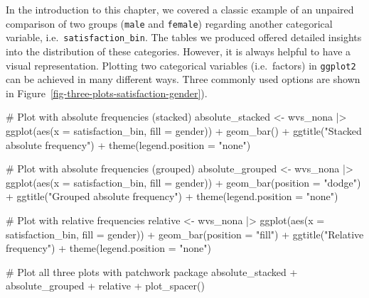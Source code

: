 \documentclass[
  letterpaper,
  DIV=11,
  numbers=noendperiod]{scrreprt}
\newenvironment{Shaded}{\begin{snugshade}}{\end{snugshade}}
\newcommand{\AttributeTok}[1]{\textcolor[rgb]{0.40,0.45,0.13}{#1}}
\newcommand{\CommentTok}[1]{\textcolor[rgb]{0.37,0.37,0.37}{#1}}
\newcommand{\FunctionTok}[1]{\textcolor[rgb]{0.28,0.35,0.67}{#1}}
\newcommand{\NormalTok}[1]{\textcolor[rgb]{0.00,0.23,0.31}{#1}}
\newcommand{\OtherTok}[1]{\textcolor[rgb]{0.00,0.23,0.31}{#1}}
\newcommand{\SpecialCharTok}[1]{\textcolor[rgb]{0.37,0.37,0.37}{#1}}
\newcommand{\StringTok}[1]{\textcolor[rgb]{0.13,0.47,0.30}{#1}}
\begin{document}
In the introduction to this chapter, we covered a classic example of an
unpaired comparison of two groups (\texttt{male} and \texttt{female})
regarding another categorical variable, i.e.~\texttt{satisfaction\_bin}.
The tables we produced offered detailed insights into the distribution
of these categories. However, it is always helpful to have a visual
representation. Plotting two categorical variables (i.e.~factors) in
\texttt{ggplot2} can be achieved in many different ways. Three commonly
used options are shown in
Figure~\ref{fig-three-plots-satisfaction-gender}).

\begin{Shaded}
\begin{Highlighting}[]
\CommentTok{\# Plot with absolute frequencies (stacked)}
\NormalTok{absolute\_stacked }\OtherTok{\textless{}{-}}
\NormalTok{  wvs\_nona }\SpecialCharTok{|\textgreater{}}
  \FunctionTok{ggplot}\NormalTok{(}\FunctionTok{aes}\NormalTok{(}\AttributeTok{x =}\NormalTok{ satisfaction\_bin,}
             \AttributeTok{fill =}\NormalTok{ gender)) }\SpecialCharTok{+}
  \FunctionTok{geom\_bar}\NormalTok{() }\SpecialCharTok{+}
  \FunctionTok{ggtitle}\NormalTok{(}\StringTok{"Stacked absolute frequency"}\NormalTok{) }\SpecialCharTok{+}
  \FunctionTok{theme}\NormalTok{(}\AttributeTok{legend.position =} \StringTok{"none"}\NormalTok{)}

\CommentTok{\# Plot with absolute frequencies (grouped)}
\NormalTok{absolute\_grouped }\OtherTok{\textless{}{-}}
\NormalTok{  wvs\_nona }\SpecialCharTok{|\textgreater{}}
  \FunctionTok{ggplot}\NormalTok{(}\FunctionTok{aes}\NormalTok{(}\AttributeTok{x =}\NormalTok{ satisfaction\_bin,}
             \AttributeTok{fill =}\NormalTok{ gender)) }\SpecialCharTok{+}
  \FunctionTok{geom\_bar}\NormalTok{(}\AttributeTok{position =} \StringTok{"dodge"}\NormalTok{) }\SpecialCharTok{+}
  \FunctionTok{ggtitle}\NormalTok{(}\StringTok{"Grouped absolute frequency"}\NormalTok{) }\SpecialCharTok{+}
  \FunctionTok{theme}\NormalTok{(}\AttributeTok{legend.position =} \StringTok{"none"}\NormalTok{)}

\CommentTok{\# Plot with relative frequencies}
\NormalTok{relative }\OtherTok{\textless{}{-}}
\NormalTok{  wvs\_nona }\SpecialCharTok{|\textgreater{}}
  \FunctionTok{ggplot}\NormalTok{(}\FunctionTok{aes}\NormalTok{(}\AttributeTok{x =}\NormalTok{ satisfaction\_bin,}
             \AttributeTok{fill =}\NormalTok{ gender)) }\SpecialCharTok{+}
  \FunctionTok{geom\_bar}\NormalTok{(}\AttributeTok{position =} \StringTok{"fill"}\NormalTok{) }\SpecialCharTok{+}
  \FunctionTok{ggtitle}\NormalTok{(}\StringTok{"Relative frequency"}\NormalTok{) }\SpecialCharTok{+}
  \FunctionTok{theme}\NormalTok{(}\AttributeTok{legend.position =} \StringTok{"none"}\NormalTok{)}

\CommentTok{\# Plot all three plots with \textquotesingle{}patchwork\textquotesingle{} package}
\NormalTok{absolute\_stacked }\SpecialCharTok{+}\NormalTok{ absolute\_grouped }\SpecialCharTok{+}\NormalTok{ relative }\SpecialCharTok{+} \FunctionTok{plot\_spacer}\NormalTok{()}
\end{Highlighting}
\end{Shaded}
\end{document}
